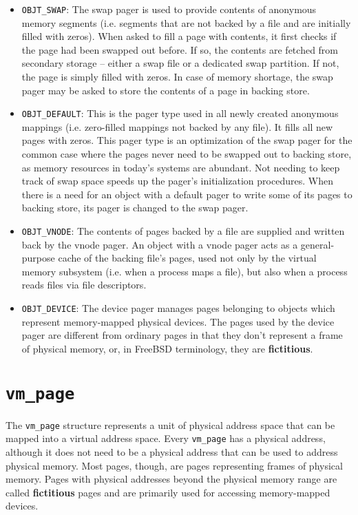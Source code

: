 \documentclass[shortabstract, english]{iithesis}
\begin{document}
\begin{itemize}

\item \texttt{OBJT_SWAP}: The swap pager is used to provide contents of
  anonymous memory segments (i.e. segments that are not backed by a file and are
  initially filled with zeros). When asked to fill a page with contents, it
  first checks if the page had been swapped out before. If so, the contents are
  fetched from secondary storage -- either a swap file or a dedicated swap
  partition. If not, the page is simply filled with zeros. In case of memory
  shortage, the swap pager may be asked to store the contents of a page in
  backing store.

\item \texttt{OBJT_DEFAULT}: This is the pager type used in all newly
  created anonymous mappings (i.e. zero-filled mappings not backed by any file).
  It fills all new pages with zeros. This pager type is an optimization of the
  swap pager for the common case where the pages never need to be swapped out to
  backing store, as memory resources in today's systems are abundant. Not
  needing to keep track of swap space speeds up the pager's initialization
  procedures. When there is a need for an object with a default pager to write
  some of its pages to backing store, its pager is changed to the swap pager.

\item \texttt{OBJT_VNODE}: The contents of pages backed by a file are
  supplied and written back by the vnode pager. An object with a vnode pager
  acts as a general-purpose cache of the backing file's pages, used not only by
  the virtual memory subsystem (i.e. when a process maps a file), but also when
  a process reads files via file descriptors.

\item \texttt{OBJT_DEVICE}: The device pager manages pages belonging to
  objects which represent memory-mapped physical devices. The pages used by the
  device pager are different from ordinary pages in that they don't represent a
  frame of physical memory, or, in FreeBSD terminology, they are
  \textbf{fictitious}.
\end{itemize}

\section{\texttt{vm_page}}

The \texttt{vm_page} structure represents a unit of physical address
space that can be mapped into a virtual address space. Every
\texttt{vm_page} has a physical address, although it does not need to be
a physical address that can be used to address physical memory. Most pages,
though, are pages representing frames of physical memory. Pages with physical
addresses beyond the physical memory range are called \textbf{fictitious} pages
and are primarily used for accessing memory-mapped devices.
\end{document}

